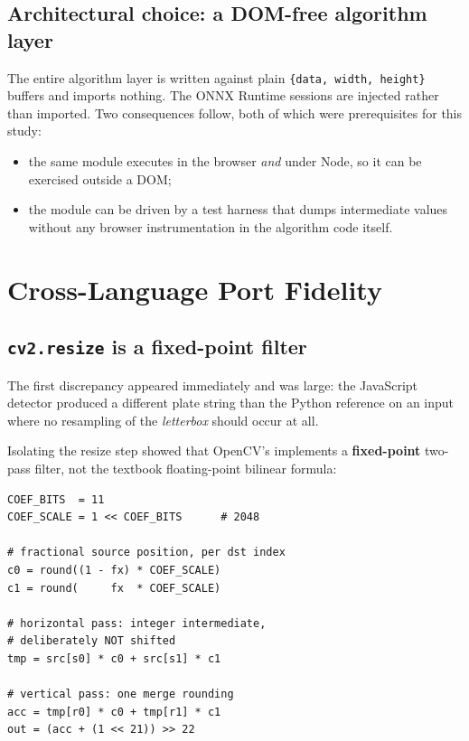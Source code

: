 \documentclass[journal]{IEEEtran}
\begin{document}
\subsection{Architectural choice: a DOM-free algorithm layer}
The entire algorithm layer is written against plain \texttt{\{data, width,
height\}} buffers and imports nothing. The ONNX Runtime sessions are injected
rather than imported. Two consequences follow, both of which were prerequisites
for this study:
\begin{itemize}
\item the same module executes in the browser \emph{and} under Node, so it can be
exercised outside a DOM;
\item the module can be driven by a test harness that dumps intermediate values
without any browser instrumentation in the algorithm code itself.
\end{itemize}

\section{Cross-Language Port Fidelity}
\label{sec:fidelity}

\subsection{\texttt{cv2.resize} is a fixed-point filter}
\label{sec:resize}

The first discrepancy appeared immediately and was large: the JavaScript detector
produced a different plate string than the Python reference on an input where no
resampling of the \emph{letterbox} should occur at all.

Isolating the resize step showed that OpenCV's  implements
a \textbf{fixed-point} two-pass filter, not the textbook floating-point bilinear
formula:

\begin{verbatim}
COEF_BITS  = 11
COEF_SCALE = 1 << COEF_BITS      # 2048

# fractional source position, per dst index
c0 = round((1 - fx) * COEF_SCALE)
c1 = round(     fx  * COEF_SCALE)

# horizontal pass: integer intermediate,
# deliberately NOT shifted
tmp = src[s0] * c0 + src[s1] * c1

# vertical pass: one merge rounding
acc = tmp[r0] * c0 + tmp[r1] * c1
out = (acc + (1 << 21)) >> 22
\end{verbatim}
\end{document}
